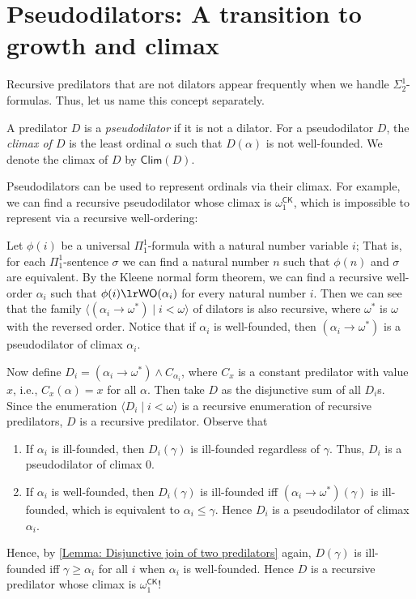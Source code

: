 \documentclass{mhkr}
\newcommand{\added}[1]{#1}
\newcommand{\lag}{\langle}
\newcommand{\rag}{\rangle}
\newcommand{\WO}{\mathsf{WO}}
\newcommand{\Clim}{\mathsf{Clim}}
\newcommand{\CK}{\mathsf{CK}}
\begin{document}
\section{Pseudodilators: A transition to growth and climax} \label{Section: Pseudodilators}
Recursive predilators that are not dilators appear frequently when we handle $\Sigma^1_2$-formulas. Thus, let us name this concept separately.
\begin{definition}
    A predilator $D$ is a \emph{pseudodilator} if it is not a dilator. For a pseudodilator $D$, the \emph{climax of $D$} is the least ordinal $\alpha$ such that $D(\alpha)$ is not well-founded. We denote the climax of $D$ by $\Clim(D)$.
\end{definition}
Pseudodilators can be used to represent ordinals via their climax. For example, we can find a recursive pseudodilator whose climax is $\omega_1^\CK$, which is impossible to represent via a recursive well-ordering:
\begin{example}
    Let $\phi(i)$ be a universal $\Pi^1_1$-formula \added{with a natural number variable $i$}; That is, for each $\Pi^1_1$-sentence $\sigma$ we can find a natural number $n$ such that $\phi(n)$ and $\sigma$ are equivalent.
    By the Kleene normal form theorem, we can find a recursive well-order $\alpha_i$ such that $\phi(i)\lr \WO(\alpha_i)$ for every natural number $i$. Then we can see that the family $\lag (\alpha_i\to\omega^*) \mid i<\omega\rag$ of dilators is also recursive, where $\omega^*$ is $\omega$ with the reversed order. Notice that if $\alpha_i$ is well-founded, then $(\alpha_i\to\omega^*)$ is a pseudodilator of climax $\alpha_i$.

    Now define $D_i = (\alpha_i\to\omega^*)\land C_{\alpha_i}$,
    where $C_x$ is a constant predilator with value $x$, i.e., $C_x(\alpha)=x$ for all $\alpha$.
    Then take $D$ as the disjunctive sum of all $D_i$s.
    Since the enumeration $\lag D_i\mid i<\omega\rag$ is a recursive enumeration of recursive predilators, $D$ is a recursive predilator. Observe that
    \begin{enumerate}
        \item If $\alpha_i$ is ill-founded, then $D_i(\gamma)$ is ill-founded regardless of $\gamma$. Thus, $D_i$ is a pseudodilator of climax 0.
        \item If $\alpha_i$ is well-founded, then $D_i(\gamma)$ is ill-founded iff $(\alpha_i\to\omega^*)(\gamma)$ is ill-founded, which is equivalent to $\alpha_i\le \gamma$. Hence $D_i$ is a pseudodilator of climax $\alpha_i$.
    \end{enumerate}
    Hence, by \autoref{Lemma: Disjunctive join of two predilators} again, $D(\gamma)$ is ill-founded iff $\gamma\ge \alpha_i$ for all $i$ when $\alpha_i$ is well-founded. Hence $D$ is a recursive predilator whose climax is $\omega_1^\CK$!
\end{example}
\end{document}
